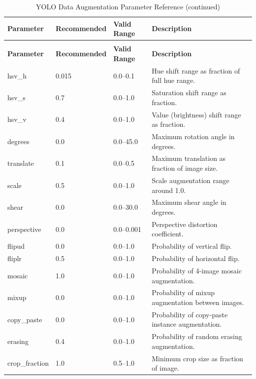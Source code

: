 \begin{longtable}{p{3.5cm}p{2cm}p{2.5cm}p{5.5cm}}
\caption{YOLO Data Augmentation Parameter Reference} \label{tab:yolo_augmentation} \\
\toprule
\textbf{Parameter} & \textbf{Recommended} & \textbf{Valid Range} & \textbf{Description} \\
\midrule
\endfirsthead
\caption[]{YOLO Data Augmentation Parameter Reference (continued)} \\
\toprule
\textbf{Parameter} & \textbf{Recommended} & \textbf{Valid Range} & \textbf{Description} \\
\midrule
\endhead
\bottomrule
\endfoot
\bottomrule
\endlastfoot
hsv\_h & 0.015 & 0.0--0.1 & Hue shift range as fraction of full hue range. \\
\addlinespace
hsv\_s & 0.7 & 0.0--1.0 & Saturation shift range as fraction. \\
\addlinespace
hsv\_v & 0.4 & 0.0--1.0 & Value (brightness) shift range as fraction. \\
\addlinespace
degrees & 0.0 & 0.0--45.0 & Maximum rotation angle in degrees. \\
\addlinespace
translate & 0.1 & 0.0--0.5 & Maximum translation as fraction of image size. \\
\addlinespace
scale & 0.5 & 0.0--1.0 & Scale augmentation range around 1.0. \\
\addlinespace
shear & 0.0 & 0.0--30.0 & Maximum shear angle in degrees. \\
\addlinespace
perspective & 0.0 & 0.0--0.001 & Perspective distortion coefficient. \\
\addlinespace
flipud & 0.0 & 0.0--1.0 & Probability of vertical flip. \\
\addlinespace
fliplr & 0.5 & 0.0--1.0 & Probability of horizontal flip. \\
\addlinespace
mosaic & 1.0 & 0.0--1.0 & Probability of 4-image mosaic augmentation. \\
\addlinespace
mixup & 0.0 & 0.0--1.0 & Probability of mixup augmentation between images. \\
\addlinespace
copy\_paste & 0.0 & 0.0--1.0 & Probability of copy-paste instance augmentation. \\
\addlinespace
erasing & 0.4 & 0.0--1.0 & Probability of random erasing augmentation. \\
\addlinespace
crop\_fraction & 1.0 & 0.5--1.0 & Minimum crop size as fraction of image. \\
\end{longtable}


